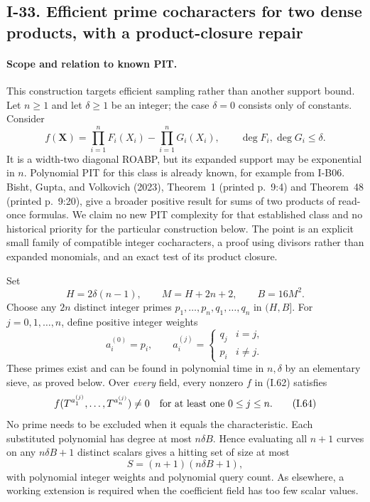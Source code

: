 \subsection{I-33. Efficient prime cocharacters for two dense products, with a product-closure repair}
\label{I-33}

\paragraph{Scope and relation to known PIT.}
This construction targets efficient sampling rather than another
support bound.  Let $n\ge1$ and let $\delta\ge1$ be an integer;
the case $\delta=0$ consists only of constants.  Consider
\[
 f(\mathbf X)=\prod_{i=1}^n F_i(X_i)-\prod_{i=1}^n G_i(X_i),
 \qquad \deg F_i,\deg G_i\le\delta.
 \tag{I.62}
\]
It is a width-two diagonal ROABP, but its expanded support
may be exponential in $n$.  Polynomial PIT for this class
is already known, for example from I-B06.  Bisht, Gupta,
and Volkovich (2023), Theorem~1 (printed p.~9:4) and
Theorem~48 (printed p.~9:20), give a broader positive result
for sums of two products of read-once formulas.  We claim
no new PIT complexity for that established class and no
historical priority for the particular construction below.
The point is an explicit small family of compatible
integer cocharacters, a proof using divisors rather than
expanded monomials, and an exact test of its product closure.

Set
\[
 H=2\delta(n-1),\qquad M=H+2n+2,\qquad B=16M^2.
\]
Choose any $2n$ distinct integer primes
$p_1,\ldots,p_n,q_1,\ldots,q_n$ in $(H,B]$.
For $j=0,1,\ldots,n$, define positive integer weights
\[
 a_i^{(0)}=p_i,\qquad
 a_i^{(j)}=\begin{cases}q_j&i=j,\\p_i&i\ne j.\end{cases}
 \tag{I.63}
\]
These primes exist and can be found in polynomial time in
$n,\delta$ by an elementary sieve, as proved below.
Over \emph{every} field, every nonzero $f$ in (I.62) satisfies
\[
 f(T^{a_1^{(j)}},\ldots,T^{a_n^{(j)}})\ne0
 \quad\hbox{for at least one }0\le j\le n.
 \tag{I.64}
\]
No prime needs to be excluded when it equals the characteristic.
Each substituted polynomial has degree at most $n\delta B$.
Hence evaluating all $n+1$ curves on any $n\delta B+1$
distinct scalars gives a hitting set of size at most
\[
 S=(n+1)(n\delta B+1),
 \tag{I.65}
\]
with polynomial integer weights and polynomial query count.
As elsewhere, a working extension is required when the
coefficient field has too few scalar values.

